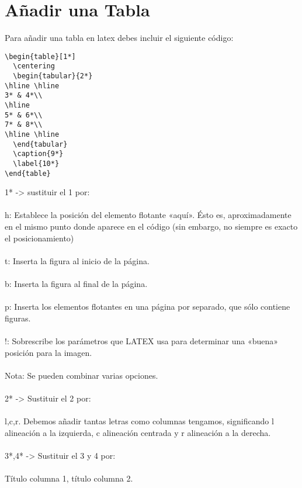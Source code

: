 \chapter{Añadir una Tabla}
Para añadir una tabla en latex debes incluir el siguiente código:
\begin{verbatim}
\begin{table}[1*]
  \centering
  \begin{tabular}{2*}
\hline \hline
3* & 4*\\
\hline
5* & 6*\\
7* & 8*\\
\hline \hline
  \end{tabular}
  \caption{9*}
  \label{10*}
\end{table}
\end{verbatim}
1* -> sustituir el 1 por:\\
\\
h:	Establece la posición del elemento flotante «aquí». Ésto es, aproximadamente en el mismo punto donde aparece en el código (sin embargo, no siempre es exacto el posicionamiento)\\
\\
t:	Inserta la figura al inicio de la página.\\
\\
b:	Inserta la figura al final de la página.\\
\\
p:	Inserta los elementos flotantes en una página por separado, que sólo contiene figuras.\\
\\
!:	Sobrescribe los parámetros que LATEX usa para determinar una «buena» posición para la imagen.\\
\\
Nota: Se pueden combinar varias opciones.\\
\\
2* -> Sustituir el 2 por:\\
\\
l,c,r. Debemos añadir tantas letras como columnas tengamos, significando l alineación a la izquierda, c alineación centrada y r alineación a la derecha.\\
\\
3*,4* -> Sustituir el 3 y 4 por:\\
\\
Título columna 1, título columna 2. \\
\\
